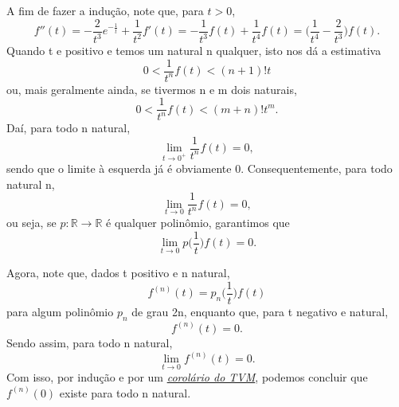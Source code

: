 \documentclass[../distribution_theory_notes.tex]{subfiles}
\begin{document}
              A fim de fazer a indução, note que, para \(t > 0\), 
                \[
                  f''(t)=-\frac{2}{t^{3}}e^{-\frac{1}{t}}+\frac{1}{t^{2}}f'(t)=-\frac{1}{t^{3}}f(t)+\frac{1}{t^{4}}f(t)=\biggl(\frac{1}{t^{4}}-\frac{2}{t^{3}}\biggr)f(t).
                \]
                Quando t e positivo e temos um natural n qualquer, isto nos dá a estimativa 
                  \[
                    0<\frac{1}{t^{n}}f(t)<(n+1)!t
                  \]
                  ou, mais geralmente ainda, se tivermos n e m dois naturais, 
                    \[
                      0<\frac{1}{t^{n}}f(t)<(m+n)!t^{m}.
                    \]
                    Daí, para todo n natural,
                      \[
                        \lim_{t\to 0^{+}}\frac{1}{t^{n}}f(t)=0,
                      \]
                      sendo que o limite à esquerda já é obviamente 0. Consequentemente, para todo natural n, 
                        \[
                          \lim_{t\to 0}\frac{1}{t^{n}}f(t)=0,
                        \]
                        ou seja, se \(p:\mathbb{R}\rightarrow \mathbb{R}\) é qualquer polinômio, garantimos que 
                          \[
                            \lim_{t\to 0}p \biggl(\frac{1}{t}\biggr)f(t)=0.
                          \]

                          Agora, note que, dados t positivo e n natural, 
                            \[
                              f^{(n)}(t)=p_{n}\biggl(\frac{1}{t}\biggr)f(t)
                            \]
                            para algum polinômio \(p_{n}\) de grau 2n, enquanto que, para t negativo e natural, 
                              \[
                                f^{(n)}(t)=0.
                              \]
                              Sendo assim, para todo n natural, 
                                \[
                                  \lim_{t\to 0}f^{(n)}(t)=0.
                                \]
                                Com isso, por indução e por um \hyperlink{tvm_cor}{\textit{corolário do TVM}}, podemos concluir que \(f^{(n)}(0)\) existe para todo n natural.
\end{document}

